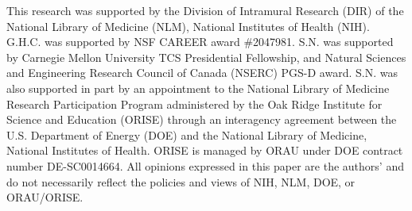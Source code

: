 This research was supported by the Division of Intramural Research (DIR) of the National Library of Medicine (NLM), National Institutes of Health (NIH). 
G.H.C. was supported by NSF CAREER award \#2047981. S.N. was supported by Carnegie Mellon University TCS Presidential Fellowship, and Natural Sciences and Engineering Research Council of Canada (NSERC) PGS-D award.
S.N. was also supported in part by an appointment to the National Library of Medicine Research Participation Program administered by the Oak Ridge Institute for Science and Education (ORISE) through an interagency agreement between the U.S. Department of Energy (DOE) and the National Library of Medicine, National Institutes of Health.
ORISE is managed by ORAU under DOE contract number DE-SC0014664.
All opinions expressed in this paper are the authors’ and do not necessarily reflect the policies and views of NIH, NLM, DOE, or ORAU/ORISE.